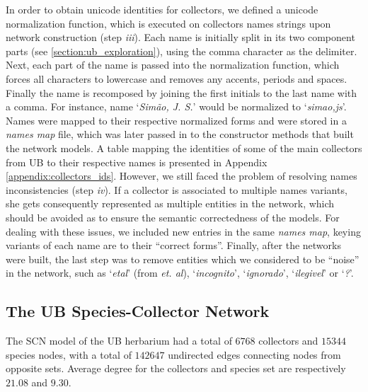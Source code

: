 In order to obtain unicode identities for collectors, we defined a unicode normalization function, which is executed on collectors names strings upon network construction (step \textit{iii}).
Each name is initially split in its two component parts (see \ref{section:ub_exploration}), using the comma character as the delimiter.
Next, each part of the name is passed into the normalization function, which forces all characters to lowercase and removes any accents, periods and spaces. 
Finally the name is recomposed by joining the first initials to the last name with a comma.
For instance, name `\textit{Simão, J. S.}' would be normalized to `\textit{simao,js}'.
Names were mapped to their respective normalized forms and were stored in a \textit{names map} file, which was later passed in to the constructor methods that built the network models.
A table mapping the identities of some of the main collectors from UB to their respective names is presented in Appendix \ref{appendix:collectors_ids}.
However, we still faced the problem of resolving names inconsistencies (step \textit{iv}).
If a collector is associated to multiple names variants, she gets consequently represented as multiple entities in the network, which should be avoided as to ensure the semantic correctedness of the models.
For dealing with these issues, we included new entries in the same \textit{names map}, keying variants of each name are to their ``correct forms''.
Finally, after the networks were built, the last step was to remove entities which we considered to be ``noise'' in the network, such as `\textit{etal}' (from \textit{et. al}), `\textit{incognito}', `\textit{ignorado}', `\textit{ilegivel}' or `\textit{?}'.






\subsection{The UB Species-Collector Network} \label{section:ub_scn}

The SCN model of the UB herbarium had a total of $6768$ collectors and $15344$ species nodes, with a total of $142647$ undirected edges connecting nodes from opposite sets. 
Average degree for the collectors and species set are respectively $21.08$ and $9.30$.

